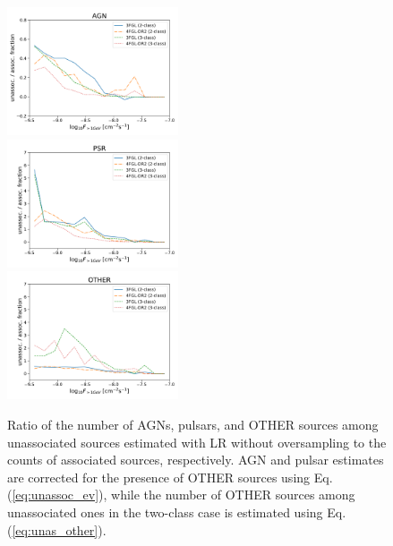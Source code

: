 \documentclass[referee]{aa} %
\begin{document}
\begin{figure}[h]
\centering
\includegraphics[width=0.45\textwidth]{plots/N_logS_diff_AGN.pdf} \\
\includegraphics[width=0.45\textwidth]{plots/N_logS_diff_PSR.pdf} \\
\includegraphics[width=0.45\textwidth]{plots/N_logS_diff_OTHER.pdf}
\caption{Ratio of the number of AGNs, pulsars, and OTHER sources among unassociated sources estimated with LR without oversampling
to the counts of associated sources, respectively.
AGN and pulsar estimates are corrected for the presence of OTHER sources using Eq. (\ref{eq:unassoc_ev}),
while the number of OTHER sources among unassociated ones in the two-class case is estimated using Eq. (\ref{eq:unas_other}).
} 
\label{fig:unass_vs_ass_frac}
\end{figure}
\end{document}
